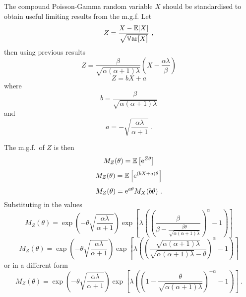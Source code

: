 The compound Poisson-Gamma random variable $X$ should be standardised to obtain useful limiting results from the m.g.f. Let
\begin{equation}
	Z = \frac{X-\operatorname{\mathbb{E}}[X]}{\sqrt{\operatorname{\mathbb{V}ar}[X]}}
	\ ,
\end{equation}
then using previous results
\begin{equation*}
	Z = \frac{\beta}{\sqrt{\alpha(\alpha+1)\lambda}}
	\left(
		X-\frac{\alpha\lambda}{\beta}
	\right)
\end{equation*}
\begin{equation}
	Z = bX+a
\end{equation}
where
\begin{equation}
	b = \frac{\beta}{\sqrt{\alpha(\alpha+1)\lambda}}
\end{equation}
and
\begin{equation}
	a = -\sqrt{\frac{\alpha\lambda}{\alpha+1}}
	\ .
\end{equation}

The m.g.f.~of $Z$ is then
\begin{equation*}
	M_Z(\theta)=\operatorname{\mathbb{E}}\left[\mathrm{e}^{Z\theta}\right]
\end{equation*}
\begin{equation*}
	M_Z(\theta)=\operatorname{\mathbb{E}}\left[\mathrm{e}^{(bX+a)\theta}\right]
\end{equation*}
\begin{equation*}
	M_Z(\theta)=\mathrm{e}^{a\theta}M_X(b\theta)
	\ .
\end{equation*}
Substituting in the values
\begin{equation*}
	M_Z(\theta)=
	\exp\left(
	    -\theta\sqrt{\frac{\alpha\lambda}{\alpha+1}}
    \right)
	\exp\left[
		\lambda
		\left(
			\left(
				\frac{\beta}{\beta-\frac{\beta\theta}{\sqrt{\alpha(\alpha+1)\lambda}}}
			\right)^\alpha
			-1
		\right)
	\right]
\end{equation*}
\begin{equation*}
	M_Z(\theta)=
	\exp\left(
	    -\theta\sqrt{\frac{\alpha\lambda}{\alpha+1}}
    \right)
	\exp\left[
		\lambda
		\left(
			\left(
				\frac{\sqrt{\alpha(\alpha+1)\lambda}}{\sqrt{\alpha(\alpha+1)\lambda}-\theta}
			\right)^\alpha
			-1
		\right)
	\right]
\end{equation*}
or in a different form
\begin{equation}
	M_Z(\theta)=
	\exp\left(
	    -\theta\sqrt{\frac{\alpha\lambda}{\alpha+1}}
    \right)
	\exp\left[
		\lambda
		\left(
			\left(
				1-\frac{\theta}{\sqrt{\alpha(\alpha+1)\lambda}}	
			\right)^{-\alpha}
			-1
		\right)
	\right]
	\ .
\end{equation}

